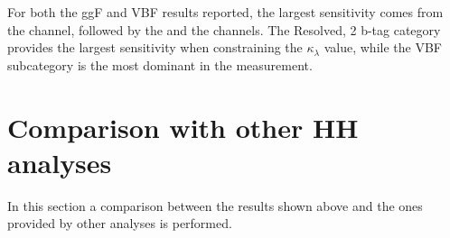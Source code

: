 \documentclass[../main.tex]{subfiles}
\begin{document}
%
%

For both the ggF and VBF results reported, the largest sensitivity comes from the \tauh\tauh{} channel, followed by the \taumu\tauh{} and the \taue\tauh{} channels. The Resolved, 2 b-tag category provides the largest sensitivity when constraining the $\kappa_\lambda$ value, while the VBF subcategory is the most dominant in the \kvv{} measurement.


\section{Comparison with other HH analyses}
\label{hh:sec:comparison}

In this section a comparison between the results shown above and the ones provided by other analyses is performed.
\end{document}
